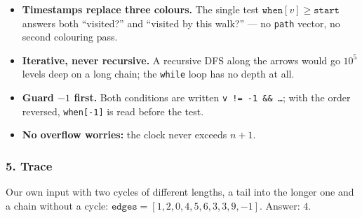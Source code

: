 \begin{tricksbox}
\begin{itemize}[leftmargin=*]
    \item \textbf{Timestamps replace three colours.} The single test $\texttt{when}[v] \ge \texttt{start}$ answers both ``visited?'' and ``visited by this walk?'' --- no \texttt{path} vector, no second colouring pass.
    \item \textbf{Iterative, never recursive.} A recursive DFS along the arrows would go $10^5$ levels deep on a long chain; the \texttt{while} loop has no depth at all.
    \item \textbf{Guard $-1$ first.} Both conditions are written \texttt{v != -1 \&\& \ldots}; with the order reversed, \texttt{when[-1]} is read before the test.
    \item \textbf{No overflow worries:} the clock never exceeds $n + 1$.
\end{itemize}
\end{tricksbox}

\subsubsection*{5. Trace}

Our own input with two cycles of different lengths, a tail into the longer one and a chain without a cycle: \;$\texttt{edges} = [1,2,0,4,5,6,3,3,9,-1]$. Answer: $4$.

\begin{diagrambox}
\end{diagrambox}

